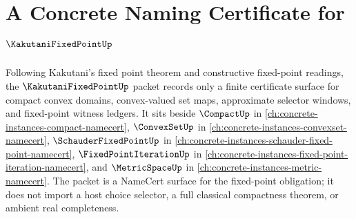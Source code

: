 \chapter{A Concrete Naming Certificate for $\KakutaniFixedPointUp$}
\label{ch:concrete-instances-kakutani-fixed-point-namecert}

Following Kakutani's fixed point theorem and constructive fixed-point readings, the $\KakutaniFixedPointUp$ packet records only a finite certificate surface for compact convex domains, convex-valued set maps, approximate selector windows, and fixed-point witness ledgers. It sits beside $\CompactUp$ in \autoref{ch:concrete-instances-compact-namecert}, $\ConvexSetUp$ in \autoref{ch:concrete-instances-convexset-namecert}, $\SchauderFixedPointUp$ in \autoref{ch:concrete-instances-schauder-fixed-point-namecert}, $\FixedPointIterationUp$ in \autoref{ch:concrete-instances-fixed-point-iteration-namecert}, and $\MetricSpaceUp$ in \autoref{ch:concrete-instances-metric-namecert}. The packet is a NameCert surface for the fixed-point obligation; it does not import a host choice selector, a full classical compactness theorem, or ambient real completeness.

